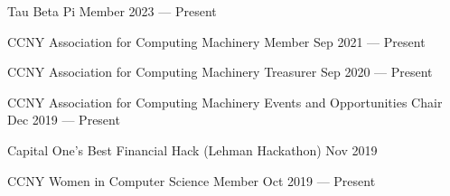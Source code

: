 Tau Beta Pi Member	\hfill 2023 --- Present
 
CCNY Association for Computing Machinery Member \hfill Sep 2021 --- Present

CCNY Association for Computing Machinery Treasurer \hfill Sep 2020 --- Present

CCNY Association for Computing Machinery Events and Opportunities Chair	\hfill Dec 2019 --- Present

Capital One's Best Financial Hack (Lehman Hackathon)	\hfill Nov 2019

CCNY Women in Computer Science Member	\hfill Oct 2019 --- Present


